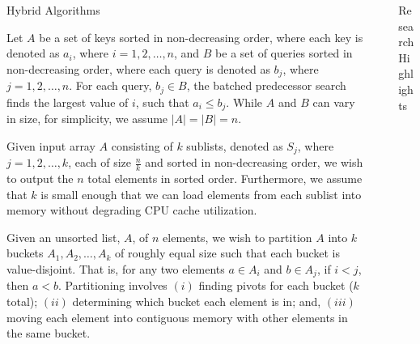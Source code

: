 \documentclass[final]{beamer}
\newlength{\sepwidth}
\newlength{\colwidth}
\newcommand{\separatorcolumn}{\begin{column}{\sepwidth}\end{column}}
\begin{document}
\begin{frame}[t]
\begin{columns}[t]
\begin{column}{\colwidth}
\begin{block}{Hybrid Algorithms}
\begin{description}[font=$\bullet$~\normalfont\scshape\color{red!50!black}]
\end{description} 

   Let $A$ be a set of keys sorted in non-decreasing order,  
   where each key is denoted as $a_i$, where $i=1, 2,\ldots,n$, and $B$ be a set of queries sorted in non-decreasing order, 
   where each query is denoted as $b_j$, where $j=1, 2,\ldots,n$. For each query, $b_j\in B$, the batched predecessor search 
   finds the largest value of $i$, such that $a_i\leq b_j$. While $A$ and $B$ can vary in size, for simplicity, we assume $|A|=|B|=n$.


   Given input array $A$ consisting of $k$ sublists, denoted as $S_j$, 
   where $j=1, 2,\ldots,k$, each of size  $\frac{n}{k}$ and sorted in non-decreasing order, we wish to output the $n$ total elements 
   in sorted order. Furthermore, we assume that $k$ is small enough that we can load elements 
   from each sublist into memory without degrading CPU cache utilization.


Given an unsorted list, $A$, of $n$ elements, we wish to partition $A$ into $k$ buckets $A_1, A_2, \ldots, A_k$ of roughly equal size such that each bucket is value-disjoint.  That is, for any two elements $a \in A_i$ and $b \in A_j$, if $i < j$, then $a<b$. Partitioning involves $(i)$ finding pivots for each bucket ($k$ total); $(ii)$ determining which bucket each element is in; and, $(iii)$ moving each element into contiguous memory with other elements in the same bucket.  

  \end{block}

\end{column}

\separatorcolumn

\begin{column}{\colwidth}

  \begin{block}{Research Highlights}



\end{block}
\end{column}
\end{columns}
\end{frame}
\end{document}
